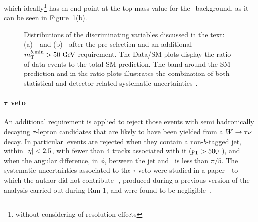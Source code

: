 				\noindent which ideally\footnote{without considering of resolution effects} has en end-point at the top mass value for the \ttbar\ background, as it can be seen in Figure~\ref{fig:preselection}(b).
				\begin{figure}[!htb]
				  \begin{center}
					  \caption{Distributions of the discriminating variables discussed in the text: (a)~\mantikttwelvezero\ and (b)~\mtbmin\ after the pre-selection and an additional $\mtbmin>50\gev$ requirement. The Data/\ac{SM} plots display the ratio of data events to the total \ac{SM} prediction. The band around the \ac{SM} prediction and in the ratio plots illustrates the combination of both statistical and detector-related systematic uncertainties~\cite{stop0L}.}
					  \label{fig:preselection}
				  \end{center}
				\end{figure}

			\paragraph{$\mathbf{\tau}$ veto}

				An additional requirement is applied to reject those events with semi hadronically decaying $\tau$-lepton candidates that are likely to have been yielded from a $W\rightarrow\tau\nu$ decay. In particular, events are rejected when they contain a non-$b$-tagged jet, within $|\eta| < 2.5$, with fewer than $4$ tracks associated with it ($p_{\mathrm{T}} > 500$ \MeV), and when the angular difference, in $\phi$, between the jet and \ptmiss\ is less than $\pi/5$. The systematic uncertainties associated to the $\tau$ veto were studied in a paper - to which the author did not contribute -, produced during a previous version of the analysis carried out during Run-1, and were found to be negligible~\cite{stop0LRun1}.




